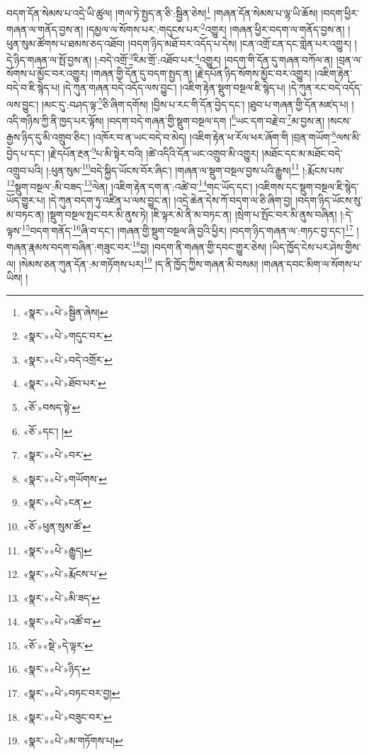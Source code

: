 བདག་དོན་སེམས་པ་འདྲེ་ཡི་ཚུལ། །གལ་ཏེ་སྤྱད་ན་ཅི་:སྦྱིན་ཅེས།\footnote{«སྣར་»«པེ་»སྦྱིན་ཞེས།} །གཞན་དོན་སེམས་པ་ལྷ་ཡི་ཆོས། །བདག་ཕྱིར་གཞན་ལ་གནོད་བྱས་ན། །དམྱལ་ལ་སོགས་པར་:གདུངས་པར་\footnote{«སྣར་»«པེ་»གདུང་བར་}འགྱུར། །གཞན་ཕྱིར་བདག་ལ་གནོད་བྱས་ན། །ཕུན་སུམ་ཚོགས་པ་ཐམས་ཅད་འཐོབ། །བདག་ཉིད་མཐོ་བར་འདོད་པ་དེས། །ངན་འགྲོ་ངན་དང་གླེན་པར་འགྱུར། །དེ་ཉིད་གཞན་ལ་སྤོ་བྱས་ན། །:བདེ་འགྲོ་\footnote{«སྣར་»«པེ་»བདེ་འགྲོར་}རིམ་གྲོ་:འཐོབ་པར་\footnote{«སྣར་»«པེ་»ཐོབ་པར་}འགྱུར། །བདག་གི་དོན་དུ་གཞན་བཀོལ་ན། །བྲན་ལ་སོགས་པ་མྱོང་བར་འགྱུར། །གཞན་གྱི་དོན་དུ་བདག་སྤྱད་ན། །རྗེ་དཔོན་ཉིད་སོགས་མྱོང་བར་འགྱུར། །འཇིག་རྟེན་བདེ་བ་ཇི་སྙེད་པ། །དེ་ཀུན་གཞན་བདེ་འདོད་ལས་བྱུང་། །འཇིག་རྟེན་སྡུག་བསྔལ་ཇི་སྙེད་པ། །དེ་ཀུན་རང་བདེ་འདོད་ལས་བྱུང་། །མང་དུ་:བཤད་ལྟ་\footnote{«ཅོ་»བསད་སྟེ་}ཅི་ཞིག་དགོས། །བྱིས་པ་རང་གི་དོན་བྱེད་དང་། །ཐུབ་པ་གཞན་གྱི་དོན་མཛད་པ། །འདི་གཉིས་ཀྱི་ནི་ཁྱད་པར་ལྟོས། །བདག་བདེ་གཞན་གྱི་སྡུག་བསྔལ་དག །\footnote{«ཅོ་»དང་། །}ཡང་དག་བརྗེ་བ་\footnote{«སྣར་»«པེ་»བར་}མ་བྱས་ན། །སངས་རྒྱས་ཉིད་དུ་མི་འགྲུབ་ཅིང་། །འཁོར་བ་ན་ཡང་བདེ་བ་མེད། །འཇིག་རྟེན་ཕ་རོལ་ཕར་ཞོག་གི །བྲན་གཡོག་\footnote{«སྣར་»«པེ་»གཡོགས་}ལས་མི་བྱེད་པ་དང་། །རྗེ་དཔོན་རྔན་\footnote{«སྣར་»«པེ་»ངན་}པ་མི་སྟེར་བའི། །ཚེ་འདིའི་དོན་ཡང་འགྲུབ་མི་འགྱུར། །མཐོང་དང་མ་མཐོང་བདེ་འགྲུབ་པའི། །:ཕུན་སུམ་\footnote{«ཅོ་»ཕུན་སུམ་ཚོ་}བདེ་སྐྱིད་ཡོངས་བོར་ཞིང་། །གཞན་ལ་སྡུག་བསྔལ་བྱས་པའི་རྒྱུས།\footnote{«སྣར་»«པེ་»རྒྱུད།} །:རྨོངས་པས་\footnote{«སྣར་»«པེ་»རྨོངས་པ་}སྡུག་བསྔལ་:མི་བཟད་\footnote{«སྣར་»«པེ་»མི་ཟད་}ལེན། །འཇིག་རྟེན་དག་ན་:འཚེ་བ་\footnote{«སྣར་»«པེ་»འཚོ་བ་}གང་ཡོད་དང་། །འཇིགས་དང་སྡུག་བསྔལ་ཇི་སྙེད་ཡོད་གྱུར་པ། །དེ་ཀུན་བདག་ཏུ་འཛིན་པ་ལས་བྱུང་ན། །འདྲེ་ཆེན་དེས་ཀོ་བདག་ལ་ཅི་ཞིག་བྱ། །བདག་ཉིད་ཡོངས་སུ་མ་བཏང་ན། །སྡུག་བསྔལ་སྤང་བར་མི་ནུས་ཏེ། །ཇི་ལྟར་མེ་ནི་མ་བཏང་ན། །སྲེག་པ་སྤོང་བར་མི་ནུས་བཞིན། །:དེ་ལྟས་\footnote{«ཅོ་»«སྡེ་»དེ་ལྟར་}བདག་གནོད་\footnote{«སྣར་»«པེ་»ཉིད་}ཞི་བ་དང་། །གཞན་གྱི་སྡུག་བསྔལ་ཞི་བྱའི་ཕྱིར། །བདག་ཉིད་གཞན་ལ་:གཏང་བྱ་དང་།\footnote{«སྣར་»«པེ་»བཏང་བར་བྱ།} །གཞན་རྣམས་བདག་བཞིན་:གཟུང་བར་\footnote{«སྣར་»«པེ་»བཟུང་བར་}བྱ། །བདག་ནི་གཞན་གྱི་དབང་གྱུར་ཅེས། །ཡིད་ཁྱོད་ངེས་པར་ཤེས་གྱིས་ལ། །སེམས་ཅན་ཀུན་དོན་:མ་གཏོགས་པར།\footnote{«སྣར་»«པེ་»མ་གཏོགས་པ།} །ད་ནི་ཁྱོད་ཀྱིས་གཞན་མི་བསམ། །གཞན་དབང་མིག་ལ་སོགས་པ་ཡིས། །
